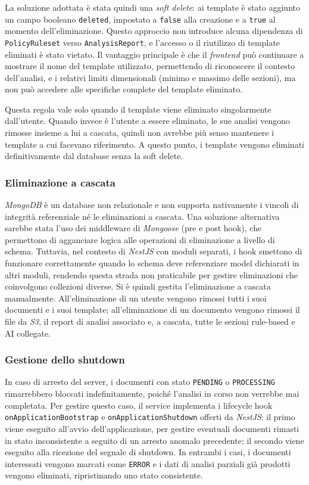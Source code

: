 La soluzione adottata è stata quindi una \emph{soft delete}: ai template è stato aggiunto un campo booleano \texttt{deleted}, impostato a \texttt{false} alla creazione e a \texttt{true} al momento dell'eliminazione. Questo approccio non introduce alcuna dipendenza di \texttt{PolicyRuleset} verso \texttt{AnalysisReport}, e l'accesso o il riutilizzo di template eliminati è stato vietato. Il vantaggio principale è che il \emph{frontend} può continuare a mostrare il nome del template utilizzato, permettendo di riconoscere il contesto dell'analisi, e i relativi limiti dimensionali (minimo e massimo delle sezioni), ma non può accedere alle specifiche complete del template eliminato. 

Questa regola vale solo quando il template viene eliminato singolarmente dall'utente. Quando invece è l'utente a essere eliminato, le sue analisi vengono rimosse insieme a lui a cascata, quindi non avrebbe più senso mantenere i template a cui facevano riferimento. A questo punto, i template vengono eliminati definitivamente dal database senza la soft delete.

\subsubsection{Eliminazione a cascata}
\emph{MongoDB} è un database non relazionale e non supporta nativamente i vincoli di integrità referenziale né le eliminazioni a cascata. Una soluzione alternativa sarebbe stata l'uso dei middleware di \emph{Mongoose} (pre e post hook), che permettono di agganciare logica alle operazioni di eliminazione a livello di schema. Tuttavia, nel contesto di \emph{NestJS} con moduli separati, i hook smettono di funzionare correttamente quando lo schema deve referenziare model dichiarati in altri moduli, rendendo questa strada non praticabile per gestire eliminazioni che coinvolgono collezioni diverse. Si è quindi gestita l'eliminazione a cascata manualmente. All'eliminazione di un utente vengono rimossi tutti i suoi documenti e i suoi template; all'eliminazione di un documento vengono rimossi il file da \emph{S3}, il report di analisi associato e, a cascata, tutte le sezioni rule-based e AI collegate.

\subsubsection{Gestione dello shutdown}
In caso di arresto del server, i documenti con stato \texttt{PENDING} o \texttt{PROCESSING} rimarrebbero bloccati indefinitamente, poiché l'analisi in corso non verrebbe mai completata. Per gestire questo caso, il service implementa i lifecycle hook \texttt{onApplicationBootstrap} e \texttt{onApplicationShutdown} offerti da \emph{NestJS}: il primo viene eseguito all'avvio dell'applicazione, per gestire eventuali documenti rimasti in stato inconsistente a seguito di un arresto anomalo precedente; il secondo viene eseguito alla ricezione del segnale di shutdown. In entrambi i casi, i documenti interessati vengono marcati come \texttt{ERROR} e i dati di analisi parziali già prodotti vengono eliminati, ripristinando uno stato consistente.

